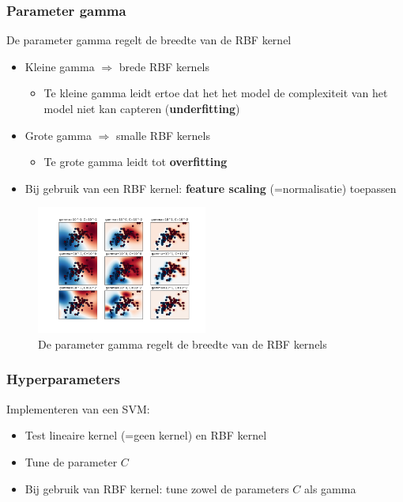 \documentclass{article}
\begin{document}
\subsubsection{Parameter gamma}

De parameter gamma regelt de breedte van de RBF kernel

\begin{itemize}
    \item Kleine gamma $\Rightarrow$ brede RBF kernels
    \begin{itemize}
        \item Te kleine gamma leidt ertoe dat het het model de complexiteit van het model niet kan capteren (\textbf{underfitting})
    \end{itemize}
    \item Grote gamma $\Rightarrow$ smalle RBF kernels
    \begin{itemize}
        \item Te grote gamma leidt tot \textbf{overfitting}
    \end{itemize}
    \item Bij gebruik van een RBF kernel: \textbf{feature scaling} (=normalisatie) toepassen
\end{itemize}

\begin{figure}[H]
    \centering
    \includegraphics[width=0.5\textwidth]{svm-kernel-gamma.png}
    \caption{De parameter gamma regelt de breedte van de RBF kernels}
\end{figure}

\subsubsection{Hyperparameters}

Implementeren van een SVM:

\begin{itemize}
    \item Test lineaire kernel (=geen kernel) en RBF kernel
    \item Tune de parameter $C$
    \item Bij gebruik van RBF kernel: tune zowel de parameters $C$ als gamma
\end{itemize}
\end{document}
